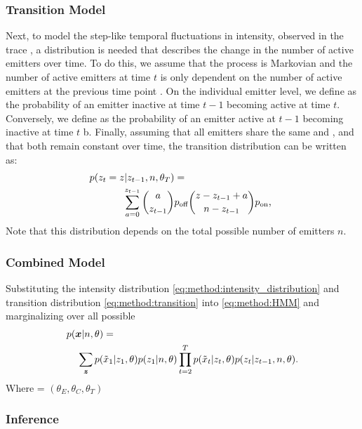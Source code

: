 \subsubsection{Transition Model}
Next, to model the step-like temporal fluctuations in intensity, observed in the trace \trace, 
  a distribution is needed that describes the change in the number of active emitters \z{} over time. 
  To do this, we assume that the process is Markovian and the number of active emitters  
  at time $t$ is only dependent on the number of active emitters at the previous time point .
  On the individual emitter level, we define \pon as the probability of an emitter inactive at time $t-1$ becoming active at time $t$. 
  Conversely,  we define \poff as the probability of an emitter active at $t-1$ becoming inactive at time $t$ b.
  Finally, assuming that all emitters share the same \pon and \poff, and that both remain constant over time, 
  the transition distribution can be written as:
  \begin{align}
    \label{eq:method:transition}
    p(z_{t} = z | z_{t-1}, n, \theta_{T}) &=\\
    \sum_{a = 0}^{z_{t-1}}
      {a \choose z_{t-1}}
      &\poff
      {z - z_{t-1} + a \choose \n - z_{t-1}}
      \pon
      \text{,} \notag\
  \end{align}
  Note that this distribution depends on the total possible number of emitters $n$.

\subsubsection{Combined Model}

Substituting the intensity distribution \eqref{eq:method:intensity_distribution} 
and transition distribution \eqref{eq:method:transition} 
into \eqref{eq:method:HMM} and marginalizing over all possible \states
% 
\begin{align}
  \label{eq:method:likelihood}
  p(\bm{x}|n,\theta) &=\\
    \sum_{\bm{z}}
      p(&\tilde{x}_{1}|z_{1}, \theta)
      p(z_{1}|n, \theta)
      \prod_{t=2}^{T}
        p(\tilde{x}_{t}|z_{t}, \theta)
        p(z_{t}|z_{t-1},n, \theta)
    \notag
  \text{.}
\end{align}
%
Where \parameters = $(\theta_{E}, \theta_{C}, \theta_{T})$

\subsubsection{Inference}

